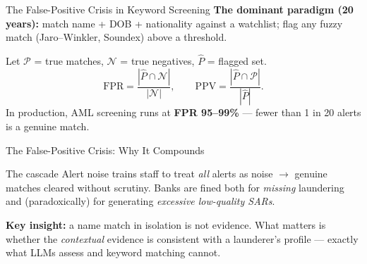 \documentclass[9pt,t]{beamer}
\begin{document}
\begin{frame}{The False-Positive Crisis in Keyword Screening}
\textbf{The dominant paradigm (20 years):} match name + DOB + nationality against
a watchlist; flag any fuzzy match (Jaro--Winkler, Soundex) above a threshold.

\medskip
\begin{underhood}
Let $\mathcal{P}$ = true matches, $\mathcal{N}$ = true negatives, $\hat P$ = flagged set.
\[
\mathrm{FPR} = \frac{|\hat P \cap \mathcal{N}|}{|\mathcal{N}|}, \qquad
\mathrm{PPV} = \frac{|\hat P \cap \mathcal{P}|}{|\hat P|}.
\]
In production, AML screening runs at \textbf{FPR 95--99\%} --- fewer than 1 in 20
alerts is a genuine match.
\end{underhood}
\end{frame}

\begin{frame}{The False-Positive Crisis: Why It Compounds}
\begin{alertblock}{The cascade}
Alert noise trains staff to treat \emph{all} alerts as noise $\to$ genuine matches
cleared without scrutiny. Banks are fined both for \emph{missing} laundering and
(paradoxically) for generating \emph{excessive low-quality SARs}.
\end{alertblock}

\medskip
\textbf{Key insight:} a name match in isolation is not evidence. What matters is
whether the \emph{contextual} evidence is consistent with a launderer's profile
--- exactly what LLMs assess and keyword matching cannot.
\end{frame}
\end{document}
